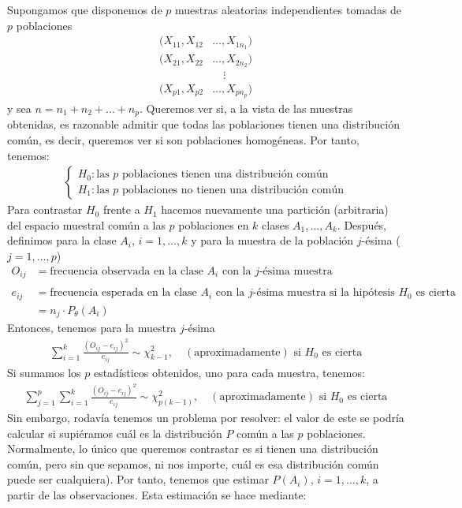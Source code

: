 Supongamos que disponemos de $p$ muestras aleatorias independientes tomadas de $p$ poblaciones
\begin{align*}
    (X_{11}, X_{12} & \ldots, X_{1n_1}) \\
    (X_{21}, X_{22} & \ldots, X_{2n_2}) \\
                    & \quad \vdots      \\
    (X_{p1}, X_{p2} & \ldots, X_{pn_p})
\end{align*}
y sea $n = n_1 + n_2 + \ldots + n_p$. Queremos ver si, a la vista de las muestras obtenidas, es razonable admitir que todas las poblaciones tienen una distribución común, es decir, queremos ver si son poblaciones homogéneas. Por tanto, tenemos:
\begin{align*}
    \begin{cases}
        H_0 : \text{las $p$ poblaciones tienen una distribución común} \\
        H_1 : \text{las $p$ poblaciones no tienen una distribución común}
    \end{cases}
\end{align*}
Para contrastar $H_0$ frente a $H_1$ hacemos nuevamente una partición (arbitraria) del espacio muestral común a las $p$ poblaciones en $k$ clases $A_1,\ldots,A_k$. Después, definimos para la clase $A_i$, $i=1,\ldots,k$ y para la muestra de la población $j$-ésima ($j=1,\ldots,p$)
\begin{align*}
    O_{ij} & = \text{frecuencia observada en la clase $A_i$ con la $j$-ésima muestra}                                 \\ \\
    e_{ij} & = \text{frecuencia esperada en la clase $A_i$  con la $j$-ésima muestra si la hipótesis $H_0$ es cierta} \\
           & = n_j \cdot P_{\theta}(A_i)
\end{align*}
Entonces, tenemos para la muestra $j$-ésima
\begin{align*}
    \sum_{i=1}^{k} \frac{(O_{ij} - e_{ij})^2}{e_{ij}} \sim \chi^2_{k-1}, \quad (\text{aproximadamente}) \text{ si $H_0$ es cierta}
\end{align*}
Si sumamos los $p$ estadísticos obtenidos, uno para cada muestra, tenemos:
\begin{align*}
    \sum_{j=1}^{p}\sum_{i=1}^{k} \frac{(O_{ij} - e_{ij})^2}{e_{ij}} \sim \chi^2_{p(k-1)}, \quad (\text{aproximadamente}) \text{ si $H_0$ es cierta}
\end{align*}
Sin embargo, rodavía tenemos un problema por resolver: el valor de este se podría calcular si supiéramos cuál es la distribución $P$ común a las $p$ poblaciones. Normalmente, lo único que queremos contrastar es si tienen una distribución común, pero sin que sepamos, ni nos importe, cuál es esa distribución común puede ser cualquiera). Por tanto, tenemos que estimar $P(A_i)$, $i=1,\ldots,k$, a partir de las observaciones. Esta estimación se hace mediante:
